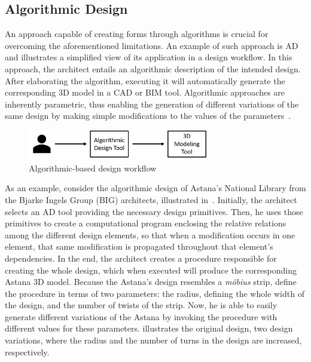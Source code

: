 \subsection{Algorithmic Design}

	An approach capable of creating forms through algorithms is crucial for overcoming the aforementioned limitations. An example of such approach is \ac{AD}~\cite{Branco2017AD} and  illustrates a simplified view of its application in a design workflow. In this approach, the architect entails an algorithmic description of the intended design. After elaborating the algorithm, executing it will automatically generate the corresponding 3D model in a \ac{CAD} or \ac{BIM} tool. Algorithmic approaches are inherently parametric, thus enabling the generation of different variations of the same design by making simple modifications to the values of the parameters~\cite{Leitao2014GD}. 
	
\begin{figure}[htbp]
\centering
\includegraphics[width=0.70\textwidth]{./Images/Introduction/AlgorithmicArchitecturalDesign.png}
\caption[General view of the Algorithmic Design Approach]{Algorithmic-based design workflow}
\label{fig:algorithmicdesign}
\end{figure}
	
	As an example, consider the algorithmic design of Astana's National Library from the Bjarke Ingels Group (BIG) architects, illustrated in~. Initially, the architect selects an \ac{AD} tool providing the necessary design primitives. Then, he uses those primitives to create a computational program enclosing the relative relations among the different design elements, so that when a modification occurs in one element, that same modification is propagated throughout that element's dependencies. In the end, the architect creates a procedure responsible for creating the whole design, which when executed will produce the corresponding Astana 3D model. Because the Astana's design resembles a \textit{möbius} strip, define the procedure in terms of two parameters: the radius, defining the whole width of the design, and the number of twists of the strip. Now, he is able to easily generate different variations of the Astana by invoking the procedure with different values for these parameters.  illustrates the original design, two design variations, where the radius and the number of turns in the design are increased, respectively. 
	
